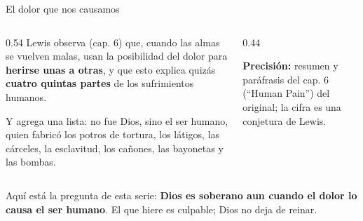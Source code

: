 \documentclass[hyperref={bookmarks=false},aspectratio=169]{beamer}
\newcommand{\destacar}[1]{\textbf{\textcolor{azul}{#1}}}
\newcommand{\precision}[1]{{\footnotesize\color{gris}\textbf{Precisión:} #1}}
\begin{document}
\begin{frame}{El dolor que nos causamos}
\begin{columns}[t,onlytextwidth]
\begin{column}{0.54\textwidth}\footnotesize
Lewis observa (cap. 6) que, cuando las almas se vuelven malas, usan la posibilidad del dolor para \destacar{herirse unas a otras}, y que esto explica quizás \destacar{cuatro quintas partes} de los sufrimientos humanos.\par\smallskip
Y agrega una lista: no fue Dios, sino el ser humano, quien fabricó los potros de tortura, los látigos, las cárceles, la esclavitud, los cañones, las bayonetas y las bombas.
\end{column}
\begin{column}{0.44\textwidth}
\centering
{}\par\smallskip
\precision{resumen y paráfrasis del cap. 6 (``Human Pain'') del original; la cifra es una conjetura de Lewis.}
\end{column}
\end{columns}\par\smallskip
\begin{tcolorbox}[colback=papiro,colframe=azul,boxrule=1pt,arc=3pt]
\footnotesize Aquí está la pregunta de esta serie: \destacar{Dios es soberano aun cuando el dolor lo causa el ser humano}. El que hiere es culpable; Dios no deja de reinar.
\end{tcolorbox}
\end{frame}
\end{document}

